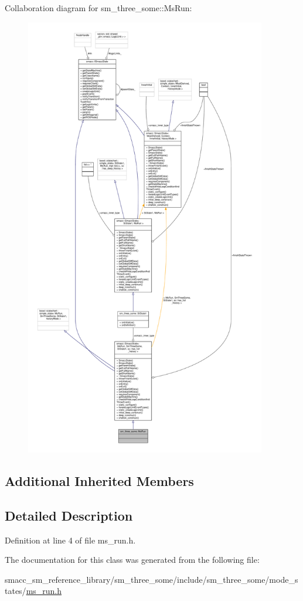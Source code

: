 Collaboration diagram for sm\+\_\+three\+\_\+some\+:\+:Ms\+Run\+:\nopagebreak
\begin{figure}[H]
\begin{center}
\leavevmode
\includegraphics[height=550pt]{classsm__three__some_1_1MsRun__coll__graph}
\end{center}
\end{figure}
\subsection*{Additional Inherited Members}


\subsection{Detailed Description}


Definition at line 4 of file ms\+\_\+run.\+h.



The documentation for this class was generated from the following file\+:\begin{DoxyCompactItemize}
\item 
smacc\+\_\+sm\+\_\+reference\+\_\+library/sm\+\_\+three\+\_\+some/include/sm\+\_\+three\+\_\+some/mode\+\_\+states/\hyperlink{ms__run_8h}{ms\+\_\+run.\+h}\end{DoxyCompactItemize}
